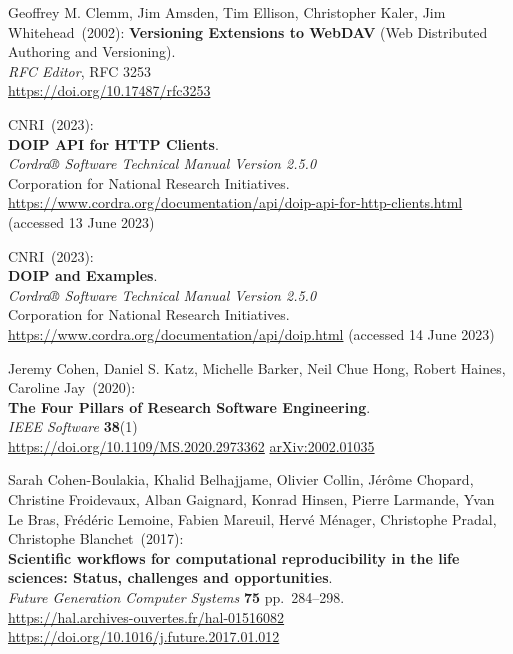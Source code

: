 \begin{thebibliography}{9}
Geoffrey M. Clemm, Jim Amsden, Tim Ellison, Christopher Kaler, Jim Whitehead~(2002):
\textbf{Versioning Extensions to WebDAV} (Web Distributed Authoring and Versioning).\\
\emph{RFC Editor}, RFC 3253 \\
\url{https://doi.org/10.17487/rfc3253}

CNRI~(2023): \\
\textbf{DOIP API for HTTP Clients}.\\
\emph{Cordra® Software Technical Manual Version 2.5.0}\\
Corporation for National Research Initiatives.\\
\url{https://www.cordra.org/documentation/api/doip-api-for-http-clients.html}
(accessed 13 June 2023)

CNRI~(2023): \\
\textbf{DOIP and Examples}.\\
\emph{Cordra® Software Technical Manual Version 2.5.0}\\
Corporation for National Research Initiatives.\\
\url{https://www.cordra.org/documentation/api/doip.html}
(accessed 14 June 2023)

Jeremy Cohen, Daniel S. Katz, Michelle Barker, Neil Chue Hong, Robert Haines, Caroline Jay~(2020):\\
\textbf{The Four Pillars of Research Software Engineering}.\\
\emph{IEEE Software} \textbf{38}(1)\\
\url{https://doi.org/10.1109/MS.2020.2973362}
\href{https://doi.org/10.48550/arXiv.2002.01035}{arXiv:2002.01035}

Sarah Cohen-Boulakia, Khalid Belhajjame, Olivier Collin, Jérôme
Chopard, Christine Froidevaux, Alban Gaignard, Konrad Hinsen, Pierre
Larmande, Yvan Le Bras, Frédéric Lemoine, Fabien Mareuil, Hervé Ménager,
Christophe Pradal, Christophe Blanchet~(2017): \\
\textbf{Scientific workflows for computational reproducibility in the
life sciences: Status, challenges and opportunities}.\\
\emph{Future Generation Computer Systems} \textbf{75} pp.~284--298.\\
\url{https://hal.archives-ouvertes.fr/hal-01516082}\\
\url{https://doi.org/10.1016/j.future.2017.01.012}


\end{thebibliography}
